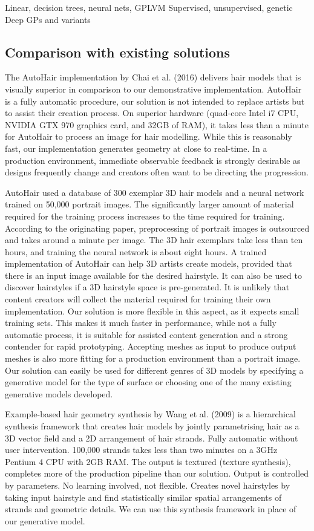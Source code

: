 \documentclass[ %
author={Dillon Keith Diep},
supervisor={Dr. Carl Henrik Ek},
degree={MEng},
title={ART-CG:},
subtitle={Assisted Real-time Content Generation of 3D Hair by Learning Manifolds},
type={Research},
year={2017} ]{dissertation}
\begin{document}
{\color{red}
Linear, decision trees, neural nets, GPLVM
Supervised, unsupervised, genetic
Deep GPs and variants
}

\subsection{Comparison with existing solutions}
The AutoHair implementation by Chai et al. (2016) \cite{autohair} delivers hair models that is visually superior in comparison to our demonstrative implementation. AutoHair is a fully automatic procedure, our solution is not intended to replace artists but to assist their creation process. On superior hardware (quad-core Intel i7 CPU, NVIDIA GTX 970 graphics card, and 32GB of RAM), it takes less than a minute for AutoHair to process an image for hair modelling. While this is reasonably fast, our implementation generates geometry at close to real-time. In a production environment, immediate observable feedback is strongly desirable as designs frequently change and creators often want to be directing the progression. 

AutoHair used a database of 300 exemplar 3D hair models and a neural network trained on 50,000 portrait images. The significantly larger amount of material required for the training process increases to the time required for training. According to the originating paper, preprocessing of portrait images is outsourced and takes around a minute per image. The 3D hair exemplars take less than ten hours, and training the neural network is about eight hours. A trained implementation of AutoHair can help 3D artists create models, provided that there is an input image available for the desired hairstyle. It can also be used to discover hairstyles if a 3D hairstyle space is pre-generated. It is unlikely that content creators will collect the material required for training their own implementation. Our solution is more flexible in this aspect, as it expects small training sets. This makes it much faster in performance, while not a fully automatic process, it is suitable for assisted content generation and a strong contender for rapid prototyping. Accepting meshes as input to produce output meshes is also more fitting for a production environment than a portrait image. Our solution can easily be used for different genres of 3D models by specifying a generative model for the type of surface or choosing one of the many existing generative models developed.

Example-based hair geometry synthesis by Wang et al. (2009) \cite{examplebasedhair} is a hierarchical synthesis framework that creates hair models by jointly parametrising hair as a 3D vector field and a 2D arrangement of hair strands. Fully automatic without user intervention. 100,000 strands takes less than two minutes on a 3GHz Pentium 4 CPU with 2GB RAM. The output is textured (texture synthesis), completes more of the production pipeline than our solution. Output is controlled by parameters.
No learning involved, not flexible. Creates novel hairstyles by taking input hairstyle and find statistically similar spatial arrangements of strands and geometric details.
We can use this synthesis framework in place of our generative model.
\end{document}
